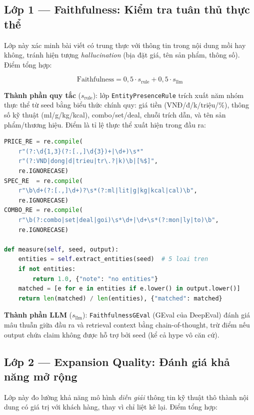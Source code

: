\subsection{Lớp 1 --- Faithfulness: Kiểm tra tuân thủ thực thể}
\label{subsec:faithfulness}

Lớp này xác minh bài viết có trung thực với thông tin trong nội dung
mồi hay không, tránh hiện tượng \emph{hallucination} (bịa đặt giá,
tên sản phẩm, thông số). Điểm tổng hợp:

\begin{equation}
  \text{Faithfulness} = 0{,}5 \cdot s_{\text{rule}} + 0{,}5 \cdot s_{\text{llm}}
  \label{eq:faithfulness}
\end{equation}

\textbf{Thành phần quy tắc} ($s_{\text{rule}}$): lớp
\texttt{EntityPresenceRule} trích xuất năm nhóm thực thể từ seed
bằng biểu thức chính quy: giá tiền (VNĐ/đ/k/triệu/\%), thông số kỹ
thuật (ml/g/kg/kcal), combo/set/deal, chuỗi trích dẫn, và tên sản
phẩm/thương hiệu. Điểm là tỉ lệ thực thể xuất hiện trong đầu ra:

\begin{lstlisting}[language=Python, caption={EntityPresenceRule --- năm nhóm thực thể F\&B.}]
PRICE_RE = re.compile(
    r"(?:\d{1,3}(?:[.,]\d{3})+|\d+)\s*"
    r"(?:VND|dong|d|trieu|tr\.?|k)\b|[%$]",
    re.IGNORECASE)
SPEC_RE  = re.compile(
    r"\b\d+(?:[.,]\d+)?\s*(?:ml|lit|g|kg|kcal|cal)\b",
    re.IGNORECASE)
COMBO_RE = re.compile(
    r"\b(?:combo|set|deal|goi)\s*\d+|\d+\s*(?:mon|ly|to)\b",
    re.IGNORECASE)

def measure(self, seed, output):
    entities = self.extract_entities(seed)  # 5 loai tren
    if not entities:
        return 1.0, {"note": "no entities"}
    matched = [e for e in entities if e.lower() in output.lower()]
    return len(matched) / len(entities), {"matched": matched}
\end{lstlisting}

\textbf{Thành phần LLM} ($s_{\text{llm}}$): \texttt{FaithfulnessGEval}
(GEval của DeepEval) đánh giá mâu thuẫn giữa đầu ra và retrieval
context bằng chain-of-thought, trừ điểm nếu output chứa claim không
được hỗ trợ bởi seed (kể cả hype vô căn cứ).

\subsection{Lớp 2 --- Expansion Quality: Đánh giá khả năng mở rộng}
\label{subsec:expansion}

Lớp này đo lường khả năng mô hình \emph{diễn giải} thông tin kỹ thuật
thô thành nội dung có giá trị với khách hàng, thay vì chỉ liệt kê lại.
Điểm tổng hợp:

